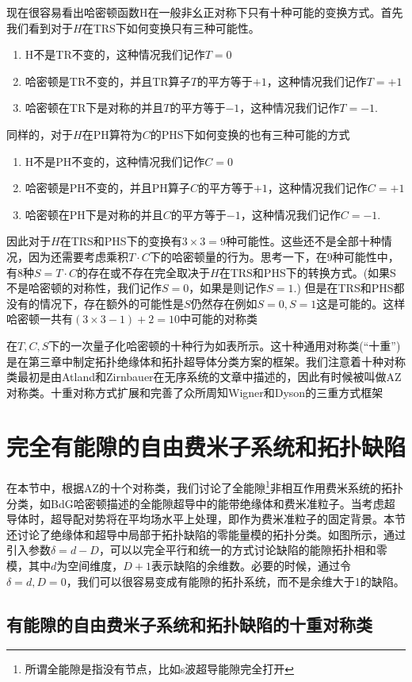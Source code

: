 \documentclass{article}
\numberwithin{equation}{subsection}
\begin{document}
现在很容易看出哈密顿函数H在一般非幺正对称下只有十种可能的变换方式。首先我们看到对于$H$在TRS下如何变换只有三种可能性。
\begin{enumerate}
    \item H不是TR不变的，这种情况我们记作$T=0$
    \item 哈密顿是TR不变的，并且TR算子$T$的平方等于$+1$，这种情况我们记作$T=+1$
    \item 哈密顿在TR下是对称的并且$T$的平方等于$-1$，这种情况我们记作$T=-1$.
\end{enumerate}
同样的，对于$H$在PH算符为$C$的PHS下如何变换的也有三种可能的方式
\begin{enumerate}
    \item H不是PH不变的，这种情况我们记作$C=0$
    \item 哈密顿是PH不变的，并且PH算子$C$的平方等于$+1$，这种情况我们记作$C=+1$
    \item 哈密顿在PH下是对称的并且$C$的平方等于$-1$，这种情况我们记作$C=-1$.
\end{enumerate}
因此对于$H$在TRS和PHS下的变换有$3\times 3=9$种可能性。这些还不是全部十种情况，因为还需要考虑乘积$T\cdot C$下的哈密顿量的行为。思考一下，在$9$种可能性中，有$8$种$S=T\cdot C$的存在或不存在完全取决于$H$在TRS和PHS下的转换方式。(如果S不是哈密顿的对称性，我们记作$S=0$，如果是则记作$S=1$.) 但是在TRS和PHS都没有的情况下，存在额外的可能性是$S$仍然存在例如$S=0,S=1$这是可能的。这样哈密顿一共有$(3\times 3-1)+2=10$中可能的对称类

在$T,C,S$下的一次量子化哈密顿的十种行为如表所示。这十种通用对称类(“十重”)是在第三章中制定拓扑绝缘体和拓扑超导体分类方案的框架。我们注意着十种对称类最初是由Atland和Zirnbauer在无序系统的文章中描述的，因此有时候被叫做AZ对称类。十重对称方式扩展和完善了众所周知Wigner和Dyson的三重方式框架
\section{完全有能隙的自由费米子系统和拓扑缺陷}
在本节中，根据AZ的十个对称类，我们讨论了全能隙\footnote{所谓全能隙是指没有节点，比如s波超导能隙完全打开}非相互作用费米系统的拓扑分类，如BdG哈密顿描述的全能隙超导中的能带绝缘体和费米准粒子。当考虑超导体时，超导配对势将在平均场水平上处理，即作为费米准粒子的固定背景。本节还讨论了绝缘体和超导中局部于拓扑缺陷的零能量模的拓扑分类。如图所示，通过引入参数$\delta=d-D$，可以以完全平行和统一的方式讨论缺陷的能隙拓扑相和零模，其中$d$为空间维度，$D+1$表示缺陷的余维数。必要的时候，通过令$\delta=d,D=0$，我们可以很容易变成有能隙的拓扑系统，而不是余维大于1的缺陷。
\subsection{有能隙的自由费米子系统和拓扑缺陷的十重对称类}
\end{document}
